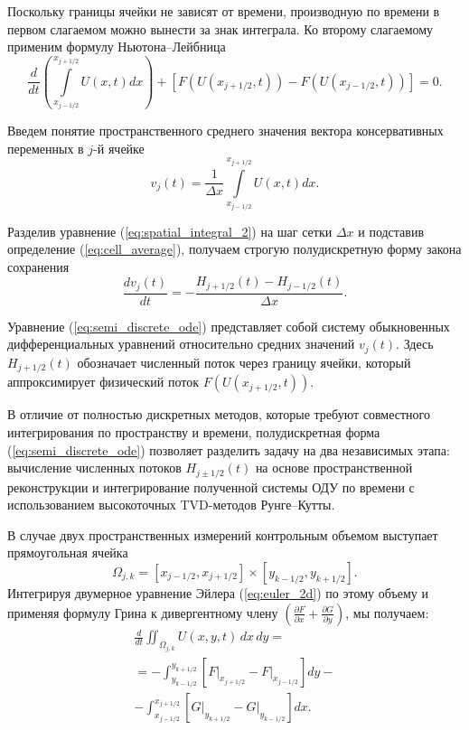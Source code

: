 \documentclass[a4paper,14pt]{extarticle}
\theoremstyle{theorem}
\theoremstyle{lemma}
\begin{document}
Поскольку границы ячейки не зависят от времени, производную по времени в первом слагаемом можно вынести за знак интеграла. Ко второму слагаемому применим формулу Ньютона--Лейбница
\begin{equation}
    \label{eq:spatial_integral_2}
    \frac{d}{dt} \left( \int\limits_{x_{j-1/2}}^{x_{j+1/2}} U(x,t) dx \right) + \left[ F\left(U(x_{j+1/2}, t)\right) - F\left(U(x_{j-1/2}, t)\right) \right] = 0.
\end{equation}

Введем понятие пространственного среднего значения вектора консервативных переменных в $j$-й ячейке
\begin{equation}
    \label{eq:cell_average}
    v_j(t) = \frac{1}{\Delta x} \int\limits_{x_{j-1/2}}^{x_{j+1/2}} U(x,t) dx.
\end{equation}

Разделив уравнение (\ref{eq:spatial_integral_2}) на шаг сетки $\Delta x$ и подставив определение (\ref{eq:cell_average}), получаем строгую полудискретную форму закона сохранения
\begin{equation}
    \label{eq:semi_discrete_ode}
    \frac{d v_j(t)}{dt} = -\frac{H_{j+1/2}(t) - H_{j-1/2}(t)}{\Delta x}.
\end{equation}

Уравнение (\ref{eq:semi_discrete_ode}) представляет собой систему обыкновенных дифференциальных уравнений относительно средних значений $v_j(t)$. Здесь $H_{j+1/2}(t)$ обозначает численный поток через границу ячейки, который аппроксимирует физический поток $F(U(x_{j+1/2}, t))$. 

В отличие от полностью дискретных методов, которые требуют совместного интегрирования по пространству и времени, полудискретная форма (\ref{eq:semi_discrete_ode}) позволяет разделить задачу на два независимых этапа: вычисление численных потоков $H_{j\pm1/2}(t)$ на основе пространственной реконструкции и интегрирование полученной системы ОДУ по времени с использованием высокоточных TVD-методов Рунге--Кутты.

В случае двух пространственных измерений контрольным объемом выступает прямоугольная ячейка \begin{equation}
    \Omega_{j,k} = [x_{j-1/2}, x_{j+1/2}] \times [y_{k-1/2}, y_{k+1/2}].
\end{equation}
Интегрируя двумерное уравнение Эйлера (\ref{eq:euler_2d}) по этому объему и применяя формулу Грина к дивергентному члену $\left(\frac{\partial F}{\partial x} + \frac{\partial G}{\partial y}\right)$, мы получаем:
\begin{equation}
    \begin{gathered}
    \frac{d}{dt} \iint_{\Omega_{j,k}} U(x,y,t)\,dx\,dy = \\
    = - \int_{y_{k-1/2}}^{y_{k+1/2}} \left[ F\big|_{x_{j+1/2}} - F\big|_{x_{j-1/2}} \right] dy - \\
    - \int_{x_{j-1/2}}^{x_{j+1/2}} \left[ G\big|_{y_{k+1/2}} - G\big|_{y_{k-1/2}} \right] dx.
\end{gathered}
\end{equation}
\end{document}
